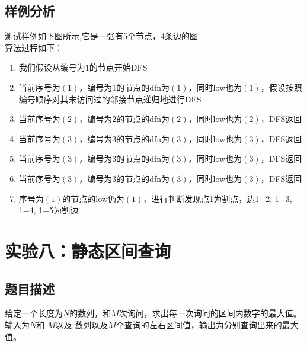 \documentclass[UTF8,a4paperdui, %
]{ctexart}
\begin{document}
\subsection{样例分析}
测试样例如下图所示,它是一张有5个节点，4条边的图
\\
算法过程如下：
\begin{enumerate}
    \item 我们假设从编号为1的节点开始DFS
    \item 当前序号为$(1)$，编号为1的节点的dfn为$(1)$，同时low也为$(1)$，假设按照编号顺序对其未访问过的邻接节点递归地进行DFS
    \item 当前序号为$(2)$，编号为2的节点的dfn为$(2)$，同时low也为$(2)$，DFS返回
    \item 当前序号为$(3)$，编号为3的节点的dfn为$(3)$，同时low也为$(3)$，DFS返回
    \item 当前序号为$(3)$，编号为3的节点的dfn为$(3)$，同时low也为$(3)$，DFS返回
    \item 当前序号为$(3)$，编号为3的节点的dfn为$(3)$，同时low也为$(3)$，DFS返回
    \item 序号为$(1)$的节点的low仍为$(1)$，进行判断发现点1为割点，边1−2, 1−3, 1−4, 1−5为割边
\end{enumerate}

\newpage
\section{实验八：静态区间查询}

\subsection{题目描述}
给定一个长度为$N$的数列，和$M$次询问，求出每一次询问的区间内数字的最大值。输入为$N$和 $M$以及
数列以及$M$个查询的左右区间值，输出为分别查询出来的最大值。
\end{document}
